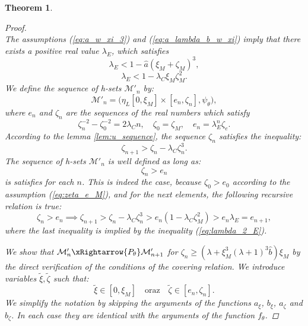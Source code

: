 \documentclass[1p]{article}
\newtheorem{theorem}{Theorem}
\begin{document}
\begin{theorem}
\begin{proof}
\begin{equation}
        \end{equation}
        The assumptions (\ref{eq:a_w_xi_3}) and (\ref{eq:a_lambda_b_w_xi}) imply that there exists a positive real value $\lambda_E$, which satisfies
        \begin{equation}
            \label{eq:lambda_2}
            \lambda_E < 1 - \hat{a} \left( \xi_M+\zeta_M \right)^3,
        \end{equation}
        \begin{equation}
            \label{eq:lambda_2_E}
            \lambda_E < 1 - \lambda_C \xi_M \zeta_M^2.
        \end{equation}
        We define the sequence of h-sets $\mathcal{M}'_n$ by:
        \[
            \mathcal{M}'_n = \big( \eta_{L} [0, \xi_M] \times [e_n, \zeta_n], \psi_\theta \big),
        \]
        where $e_n$ and $\zeta_n$ are the sequences of the real numbers which satisfy
        \[
            \zeta_n^{-2} - \zeta_0^{-2} = 2 \lambda_C  n, \quad \zeta_0 = \zeta_M, \quad
            e_n = \lambda_E^n \zeta_e.
        \]
        According to the lemma \ref{lem:u_sequence}, the sequence $\zeta_n$ satisfies the inequality:
        \[
            \zeta_{n+1} > \zeta_n - \lambda_C \zeta_n^3.
        \]
        The sequence of h-sets $\mathcal{M}'_n$ is well defined as long as:
        \[
            \zeta_n > e_n
        \]
        is satisfies for each $n$. This is indeed the case, because $\zeta_0 > e_0$ according to the assumption (\ref{eq:zeta_e_M}), and for the next elements, the following recursive relation is true:
        \[
            \zeta_n > e_n \implies \zeta_{n+1} >
            \zeta_n - \lambda_C \zeta_n^3 >
            e_n \left( 1 - \lambda_C \zeta_M^2 \right) >
            e_n \lambda_E = e_{n+1},
        \]
        where the last inequality is implied by the inequality (\ref{eq:lambda_2_E}).

        We show that $\mathcal{M}'_n \xRightarrow{P_\theta} \mathcal{M}'_{n+1}$ for $\zeta_n \geq \left(\lambda + \xi_M^3 (\lambda + 1)^3 \hat{b} \right) \xi_M$ by the direct verification of the conditions of the covering relation. We introduce variables $\tilde{\xi} ,\tilde{\zeta}$ such that:
        \[
            \tilde{\xi} \in [0,\xi_M] \quad\text{oraz}\quad \tilde{\zeta} \in [e_n, \zeta_n].
        \]
        We simplify the notation by skipping the arguments of the functions $a_\xi$, $b_\xi$, $a_\zeta$ and $b_\zeta$. In each case they are identical with the arguments of the function $f_\theta$.


\end{proof}
\end{theorem}
\end{document}
